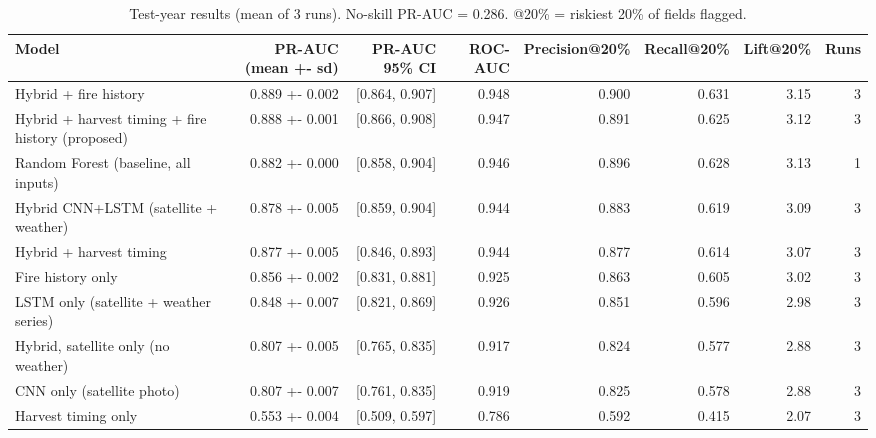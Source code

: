 \begin{table}[t]
\centering
\caption{Test-year results (mean of 3 runs). No-skill PR-AUC = 0.286. @20\% = riskiest 20\% of fields flagged.}
\label{tab:table2_models}
\begin{tabular}{lrrrrrrr}
\hline
Model & PR-AUC (mean +- sd) & PR-AUC 95\% CI & ROC-AUC & Precision@20\% & Recall@20\% & Lift@20\% & Runs \\
\hline
Hybrid + fire history & 0.889 +- 0.002 & [0.864, 0.907] & 0.948 & 0.900 & 0.631 & 3.15 & 3 \\
Hybrid + harvest timing + fire history (proposed) & 0.888 +- 0.001 & [0.866, 0.908] & 0.947 & 0.891 & 0.625 & 3.12 & 3 \\
Random Forest (baseline, all inputs) & 0.882 +- 0.000 & [0.858, 0.904] & 0.946 & 0.896 & 0.628 & 3.13 & 1 \\
Hybrid CNN+LSTM (satellite + weather) & 0.878 +- 0.005 & [0.859, 0.904] & 0.944 & 0.883 & 0.619 & 3.09 & 3 \\
Hybrid + harvest timing & 0.877 +- 0.005 & [0.846, 0.893] & 0.944 & 0.877 & 0.614 & 3.07 & 3 \\
Fire history only & 0.856 +- 0.002 & [0.831, 0.881] & 0.925 & 0.863 & 0.605 & 3.02 & 3 \\
LSTM only (satellite + weather series) & 0.848 +- 0.007 & [0.821, 0.869] & 0.926 & 0.851 & 0.596 & 2.98 & 3 \\
Hybrid, satellite only (no weather) & 0.807 +- 0.005 & [0.765, 0.835] & 0.917 & 0.824 & 0.577 & 2.88 & 3 \\
CNN only (satellite photo) & 0.807 +- 0.007 & [0.761, 0.835] & 0.919 & 0.825 & 0.578 & 2.88 & 3 \\
Harvest timing only & 0.553 +- 0.004 & [0.509, 0.597] & 0.786 & 0.592 & 0.415 & 2.07 & 3 \\
\hline
\end{tabular}
\end{table}
